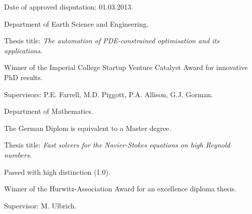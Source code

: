 \documentclass[11pt]{article}
\newenvironment{outerlist}[1][\enskip\textbullet]
        {\begin{itemize}[ #1]}{\end{itemize}}
\newenvironment{innerlist}[1][\enskip\textbullet]
        {\begin{compactitem}[#1]}{\end{compactitem}}
\begin{document}
\begin{outerlist}
\item[] 
        \begin{innerlist}
            \item Date of approved disputation: 01.03.2013.
            \item Department of Earth Science and Engineering.
            \item Thesis title: \textit{The automation of PDE-constrained optimisation and its applications}.
            \item Winner of the Imperial College Startup Venture Catalyst Award for innovative PhD results.
            \item Supervisors: P.E. Farrell, M.D. Piggott, P.A. Allison, G.J. Gorman.
        \end{innerlist}
\item[] 
            \begin{innerlist}
                \item Department of Mathematics.
                \item The German Diplom is equivalent to a Master degree.
                \item Thesis title: \textit{Fast solvers for the Navier-Stokes equations on high Reynold numbers}.
                \item Passed with high distinction (1.0).
                \item Winner of the {{Hurwitz-Association Award}} for an excellence diploma thesis.
                \item Supervisor: M. Ulbrich.
            \end{innerlist}
\item[] 
\end{outerlist}
\end{document}
